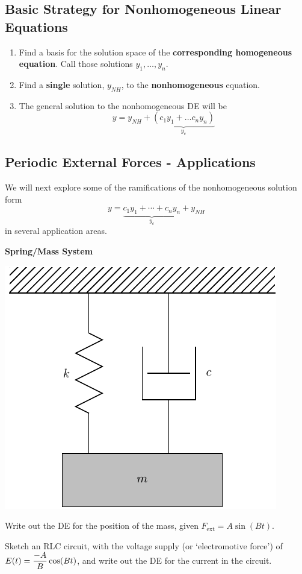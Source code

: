 \newpage

\subsection*{Basic Strategy for Nonhomogeneous Linear Equations}
\begin{enumerate}
\item Find a basis for the solution space of the {\bf corresponding homogeneous
  equation}.  Call those solutions $y_1, \ldots, y_n$. \\[2ex]
\item Find a {\bf single} solution, $y_{NH}$,  to the {\bf nonhomogeneous} equation. \\[2ex]
\item The general solution to the nonhomogeneous DE will be $$y = y_{NH} + \underbrace{\left(c_1 y_1 + \ldots c_n y_n\right)}_{y_c}$$
\end{enumerate}

\newpage
{}
\subsection*{Periodic External Forces - Applications}
We will next explore some of the ramifications of the nonhomogeneous solution form
$$y = \underbrace{c_1 y_1 + \dotsb + c_n y_n}_{y_c} + y_{NH}$$
in several application areas.

\newpage
{\bf Spring/Mass System}

\problem
 \includegraphics[width=0.4\linewidth]{graphics/notes_08_hanging_mass}

 Write out the DE for the position of the mass, given $F_{\mbox{ext}} = A
 \sin(Bt)$.


\newpage

\problem
  Sketch an RLC circuit, with the voltage supply (or `electromotive
  force') of $\displaystyle E(t) = \frac{-A}{B} \cos(Bt)$, and write out the DE
  for the current in the circuit.

\vfill

